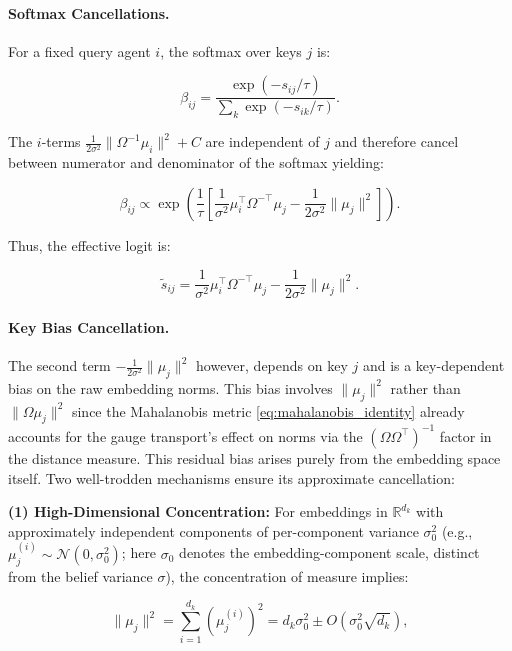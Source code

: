 \documentclass[twoside,11pt]{article}
\begin{document}
\paragraph{Softmax Cancellations.}

For a fixed query agent $i$, the softmax over keys $j$ is:

\begin{equation}
\beta_{ij} = \frac{\exp(-s_{ij}/\tau)}{\sum_k \exp(-s_{ik}/\tau)}.
\end{equation}

The $i$-terms $\frac{1}{2\sigma^2}\|\Omega^{-1}\mu_i\|^2 + C$ are independent of $j$ and therefore cancel between numerator and denominator of the softmax yielding:

\begin{equation}
\beta_{ij} \propto \exp\left(\frac{1}{\tau}\left[\frac{1}{\sigma^2}\mu_i^\top\Omega^{-\top}\mu_j - \frac{1}{2\sigma^2}\|\mu_j\|^2\right]\right).
\end{equation}

Thus, the effective logit is:

\begin{equation}
\tilde{s}_{ij} = \frac{1}{\sigma^2}\mu_i^\top\Omega^{-\top}\mu_j - \frac{1}{2\sigma^2}\|\mu_j\|^2.
\end{equation}

\paragraph{Key Bias Cancellation.}

The second term $-\frac{1}{2\sigma^2}\|\mu_j\|^2$ however, depends on key $j$ and is a key-dependent bias on the raw embedding norms. This bias involves $\|\mu_j\|^2$ rather than $\|\Omega\mu_j\|^2$ since the Mahalanobis metric \eqref{eq:mahalanobis_identity} already accounts for the gauge transport's effect on norms via the $(\Omega\Omega^\top)^{-1}$ factor in the distance measure. This residual bias arises purely from the embedding space itself. Two well-trodden mechanisms ensure its approximate cancellation:

\textbf{(1) High-Dimensional Concentration:}
For embeddings in $\mathbb{R}^{d_k}$ with approximately independent components of per-component variance $\sigma_0^2$ (e.g., $\mu_j^{(i)} \sim \mathcal{N}(0, \sigma_0^2)$; here $\sigma_0$ denotes the embedding-component scale, distinct from the belief variance $\sigma$), the concentration of measure implies:

\begin{equation}
\|\mu_j\|^2 = \sum_{i=1}^{d_k} (\mu_j^{(i)})^2 = d_k\sigma_0^2 \pm O(\sigma_0^2\sqrt{d_k}),
\end{equation}
\end{document}
